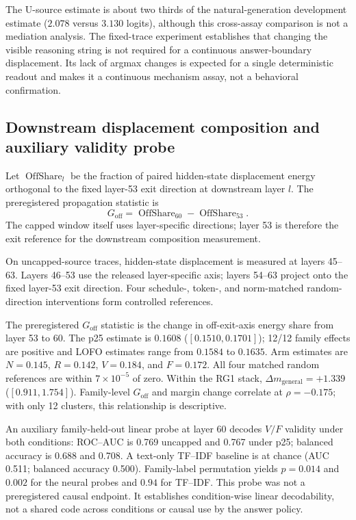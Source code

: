 \documentclass[letterpaper]{article}
\begin{document}
The U-source estimate is about two thirds of the natural-generation development estimate ($2.078$ versus $3.130$ logits), although this cross-assay comparison is not a mediation analysis.  The fixed-trace experiment establishes that changing the visible reasoning string is not required for a continuous answer-boundary displacement.  Its lack of argmax changes is expected for a single deterministic readout and makes it a continuous mechanism assay, not a behavioral confirmation.

\subsection{Downstream displacement composition and auxiliary validity probe}

Let $\operatorname{OffShare}_l$ be the fraction of paired hidden-state displacement energy orthogonal to the fixed layer-53 exit direction at downstream layer $l$.  The preregistered propagation statistic is
\begin{equation}
G_{\mathrm{off}}=\operatorname{OffShare}_{60}-\operatorname{OffShare}_{53}.
\end{equation}
The capped window itself uses layer-specific directions; layer 53 is therefore the exit reference for the downstream composition measurement.

On uncapped-source traces, hidden-state displacement is measured at layers 45--63.  Layers 46--53 use the released layer-specific axis; layers 54--63 project onto the fixed layer-53 exit direction.  Four schedule-, token-, and norm-matched random-direction interventions form controlled references.

The preregistered $G_{\mathrm{off}}$ statistic is the change in off-exit-axis energy share from layer 53 to 60.  The p25 estimate is $0.1608$ ($[0.1510,0.1701]$); 12/12 family effects are positive and LOFO estimates range from $0.1584$ to $0.1635$.  Arm estimates are $N=0.145$, $R=0.142$, $V=0.184$, and $F=0.172$.  All four matched random references are within $7\times10^{-5}$ of zero.  Within the RG1 stack, $\Delta m_{\mathrm{general}}=+1.339$ ($[0.911,1.754]$).  Family-level $G_{\mathrm{off}}$ and margin change correlate at $\rho=-0.175$; with only 12 clusters, this relationship is descriptive.

An auxiliary family-held-out linear probe at layer 60 decodes $V/F$ validity under both conditions: ROC--AUC is 0.769 uncapped and 0.767 under p25; balanced accuracy is 0.688 and 0.708.  A text-only TF--IDF baseline is at chance (AUC 0.511; balanced accuracy 0.500).  Family-label permutation yields $p=0.014$ and $0.002$ for the neural probes and $0.94$ for TF--IDF.  This probe was not a preregistered causal endpoint.  It establishes condition-wise linear decodability, not a shared code across conditions or causal use by the answer policy.
\end{document}

